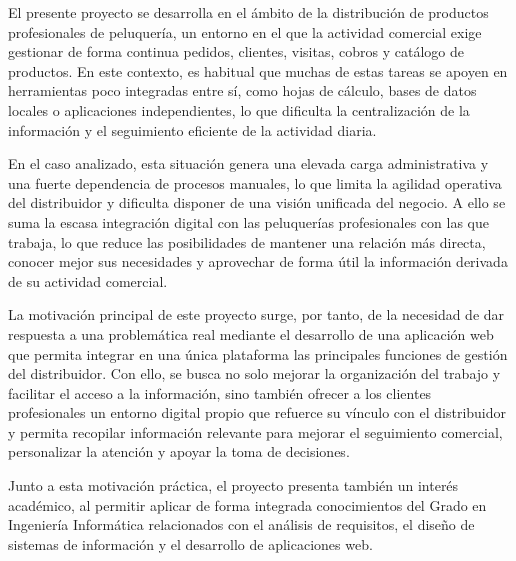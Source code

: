 El presente proyecto se desarrolla en el ámbito de la distribución de productos profesionales de peluquería, un entorno en el que la actividad comercial exige gestionar de forma continua pedidos, clientes, visitas, cobros y catálogo de productos. En este contexto, es habitual que muchas de estas tareas se apoyen en herramientas poco integradas entre sí, como hojas de cálculo, bases de datos locales o aplicaciones independientes, lo que dificulta la centralización de la información y el seguimiento eficiente de la actividad diaria.

En el caso analizado, esta situación genera una elevada carga administrativa y una fuerte dependencia de procesos manuales, lo que limita la agilidad operativa del distribuidor y dificulta disponer de una visión unificada del negocio. A ello se suma la escasa integración digital con las peluquerías profesionales con las que trabaja, lo que reduce las posibilidades de mantener una relación más directa, conocer mejor sus necesidades y aprovechar de forma útil la información derivada de su actividad comercial.

La motivación principal de este proyecto surge, por tanto, de la necesidad de dar respuesta a una problemática real mediante el desarrollo de una aplicación web que permita integrar en una única plataforma las principales funciones de gestión del distribuidor. Con ello, se busca no solo mejorar la organización del trabajo y facilitar el acceso a la información, sino también ofrecer a los clientes profesionales un entorno digital propio que refuerce su vínculo con el distribuidor y permita recopilar información relevante para mejorar el seguimiento comercial, personalizar la atención y apoyar la toma de decisiones.

Junto a esta motivación práctica, el proyecto presenta también un interés académico, al permitir aplicar de forma integrada conocimientos del Grado en Ingeniería Informática relacionados con el análisis de requisitos, el diseño de sistemas de información y el desarrollo de aplicaciones web.